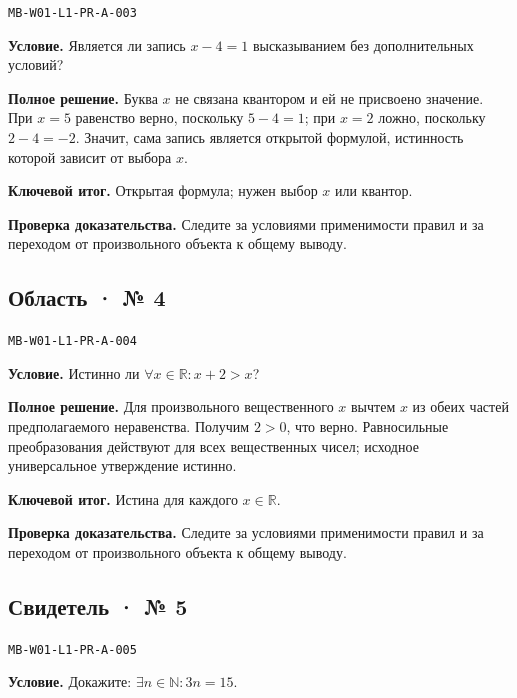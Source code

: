 \documentclass[11pt,a4paper,openany]{book}
\newcommand{\muid}[1]{\texttt{\footnotesize #1}}
\begin{document}
\muid{MB-W01-L1-PR-A-003}\par

\textbf{Условие.} Является ли запись $x-4=1$ высказыванием без дополнительных условий?\par

\textbf{Полное решение.} Буква $x$ не связана квантором и ей не присвоено значение. При $x=5$ равенство верно, поскольку $5-4=1$; при $x=2$ ложно, поскольку $2-4=-2$. Значит, сама запись является открытой формулой, истинность которой зависит от выбора $x$.


\begin{learnbox}\textbf{Ключевой итог.} Открытая формула; нужен выбор $x$ или квантор.\par \textbf{Проверка доказательства.} 
Следите за условиями применимости правил и за переходом от произвольного объекта к общему выводу. 
\end{learnbox}

\subsection*{Область · № 4}\hypertarget{solution:MB-W01-L1-PR-A-004}{}

\muid{MB-W01-L1-PR-A-004}\par

\textbf{Условие.} Истинно ли $\forall x\in\mathbb R\colon x+2>x$?\par

\textbf{Полное решение.} Для произвольного вещественного $x$ вычтем $x$ из обеих частей предполагаемого неравенства. Получим $2>0$, что верно. Равносильные преобразования действуют для всех вещественных чисел; исходное универсальное утверждение истинно.


\begin{learnbox}\textbf{Ключевой итог.} Истина для каждого $x\in\mathbb R$.\par \textbf{Проверка доказательства.} 
Следите за условиями применимости правил и за переходом от произвольного объекта к общему выводу. 
\end{learnbox}

\subsection*{Свидетель · № 5}\hypertarget{solution:MB-W01-L1-PR-A-005}{}

\muid{MB-W01-L1-PR-A-005}\par

\textbf{Условие.} Докажите: $\exists n\in\mathbb N\colon 3n=15$.\par
\end{document}

